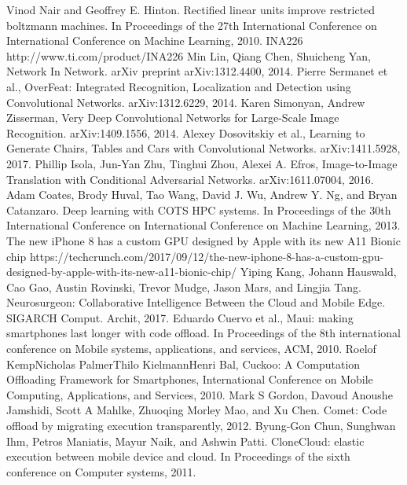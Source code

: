 \documentclass[conference,9pt]{IEEEtran}
\begin{document}
\begin{thebibliography}{00}
 Vinod Nair and Geoffrey E. Hinton. Rectified linear units improve restricted boltzmann machines. In Proceedings of the 27th International Conference on International Conference on Machine Learning, 2010.
 INA226 http://www.ti.com/product/INA226
 Min Lin, Qiang Chen, Shuicheng Yan, Network In Network. arXiv preprint arXiv:1312.4400, 2014.
 Pierre Sermanet et al., OverFeat: Integrated Recognition, Localization and Detection using Convolutional Networks. arXiv:1312.6229, 2014.
 Karen Simonyan, Andrew Zisserman, Very Deep Convolutional Networks for Large-Scale Image Recognition. arXiv:1409.1556, 2014.
 Alexey Dosovitskiy et al., Learning to Generate Chairs, Tables and Cars with Convolutional Networks. arXiv:1411.5928, 2017.
 Phillip Isola, Jun-Yan Zhu, Tinghui Zhou, Alexei A. Efros, Image-to-Image Translation with Conditional Adversarial Networks. arXiv:1611.07004, 2016.
 Adam Coates, Brody Huval, Tao Wang, David J. Wu, Andrew Y. Ng, and Bryan Catanzaro. Deep learning with COTS HPC systems. In Proceedings of the 30th International Conference on International Conference on Machine Learning, 2013.
 The new iPhone 8 has a custom GPU designed by Apple with its new A11 Bionic chip https://techcrunch.com/2017/09/12/the-new-iphone-8-has-a-custom-gpu-designed-by-apple-with-its-new-a11-bionic-chip/
 Yiping Kang, Johann Hauswald, Cao Gao, Austin Rovinski, Trevor Mudge, Jason Mars, and Lingjia Tang. Neurosurgeon: Collaborative Intelligence Between the Cloud and Mobile Edge. SIGARCH Comput. Archit, 2017.
 Eduardo Cuervo et al., Maui: making smartphones last longer with code offload. In Proceedings of the 8th international conference on Mobile systems, applications, and services, ACM, 2010.
 Roelof KempNicholas PalmerThilo KielmannHenri Bal, Cuckoo: A Computation Offloading Framework for Smartphones, International Conference on Mobile Computing, Applications, and Services, 2010.
 Mark S Gordon, Davoud Anoushe Jamshidi, Scott A Mahlke, Zhuoqing Morley Mao, and Xu Chen. Comet: Code offload
by migrating execution transparently, 2012.
 Byung-Gon Chun, Sunghwan Ihm, Petros Maniatis, Mayur Naik, and Ashwin Patti. CloneCloud: elastic execution between mobile device and cloud. In Proceedings of the sixth conference on Computer systems, 2011.
\end{thebibliography}
\end{document}
